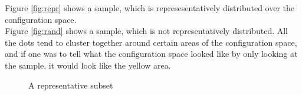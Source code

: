 \documentclass[a4paper,11pt]{report}
\newcommand{\figa}{
    \begin{figure}[!htpb]
    \centering
}
\newcommand{\figb}[2]{
    \caption{#1}
    \label{#2}
    \end{figure}
}
\begin{document}
Figure \ref{fig:repr} shows a sample, which is represesentatively distributed 
over the configuration space. 
\\

Figure \ref{fig:rand} shows a sample, which is not representatively 
distributed. All the dots tend to cluster together around certain areas of the 
configuration space, and if one was to tell what the configuration space looked 
like by only looking at the sample, it would look like the yellow area.

\figa
\figb{A representative subset}{fig:reprrand}
\end{document}
